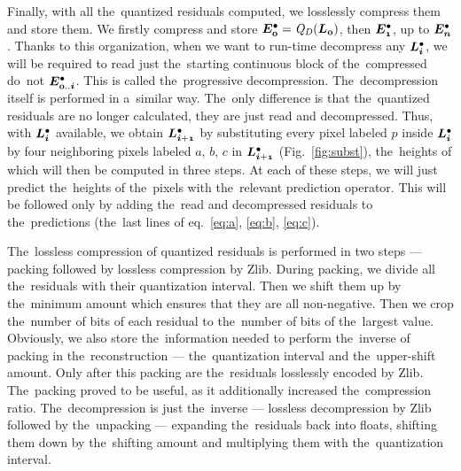 Finally, with all the~quantized residuals computed, we losslessly compress them and store them. We firstly compress and store $\objdot{E}{0} = \opnorm{Q}{D}(\lnorm{0})$, then $\objdot{E}{1}$, up to $\objdot{E}{n}$. Thanks to this organization, when we want to run-time decompress any $\ldot{i}$, we will be required to read just the~starting continuous block of the~compressed do~not $\objdot{E}{0..i}$. This is called the~progressive decompression. The~decompression itself is performed in a~similar way. The~only difference is that the~quantized residuals are no longer calculated, they are just read and decompressed. Thus, with $\ldot{i}$ available, we obtain $\ldot{i+1}$ by substituting every pixel labeled $p$ inside $\ldot{i}$ by four neighboring pixels labeled $a$, $b$, $c$ in $\ldot{i+1}$ (Fig.~\ref{fig:subst}), the~heights of which will then be computed in three steps. At each of these steps, we will just predict the~heights of the~pixels with the~relevant prediction operator. This will be followed only by adding the~read and decompressed residuals  to the~predictions (the~last lines of eq.~\ref{eq:a}, \ref{eq:b}, \ref{eq:c}).
 
  The~lossless compression of quantized residuals is performed in two steps --- packing followed by lossless compression by Zlib. During packing, we divide all the~residuals with their quantization interval. Then we shift them up by the~minimum amount which ensures that they are all non-negative. Then we crop the~number of bits of each residual to the~number of bits of the~largest value. Obviously, we also store the~information needed to perform the~inverse of packing in the~reconstruction --- the~quantization interval and the~upper-shift amount. Only after this packing are the~residuals losslessly encoded by Zlib. The~packing proved to be useful, as it additionally increased the~compression ratio. The~decompression is just the~inverse --- lossless decompression by Zlib followed by the~unpacking --- expanding the~residuals back into floats, shifting them down by the~shifting amount and multiplying them with the~quantization interval.
